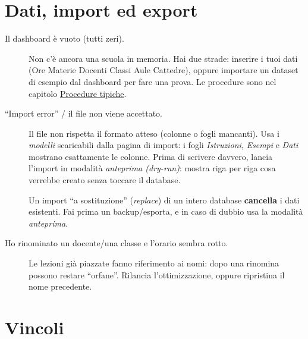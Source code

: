 \section{Dati, import ed export}

\begin{description}

\item[Il dashboard \`e vuoto (tutti zeri).]
Non c'\`e ancora una scuola in memoria. Hai due strade: inserire
i tuoi dati (Ore \textrightarrow{} Materie \textrightarrow{}
Docenti \textrightarrow{} Classi \textrightarrow{} Aule
\textrightarrow{} Cattedre), oppure importare un dataset di
esempio dal dashboard per fare una prova. Le procedure sono nel
capitolo \hyperref[ch:workflow_tipici]{Procedure tipiche}.

\item[``Import error'' / il file non viene accettato.]
Il file non rispetta il formato atteso (colonne o fogli
mancanti). Usa i \emph{modelli} scaricabili dalla pagina di
import: i fogli \emph{Istruzioni}, \emph{Esempi} e \emph{Dati}
mostrano esattamente le colonne. Prima di scrivere davvero, lancia
l'import in modalit\`a \emph{anteprima (dry-run)}: mostra riga per
riga cosa verrebbe creato senza toccare il database.

\begin{avvertenzabox}
Un import ``a sostituzione'' (\emph{replace}) di un intero
database \textbf{cancella} i dati esistenti. Fai prima un
backup/esporta, e in caso di dubbio usa la modalit\`a
\emph{anteprima}.
\end{avvertenzabox}

\item[Ho rinominato un docente/una classe e l'orario sembra rotto.]
Le lezioni gi\`a piazzate fanno riferimento ai nomi: dopo una
rinomina possono restare ``orfane''. Rilancia l'ottimizzazione,
oppure ripristina il nome precedente.

\end{description}

\section{Vincoli}

